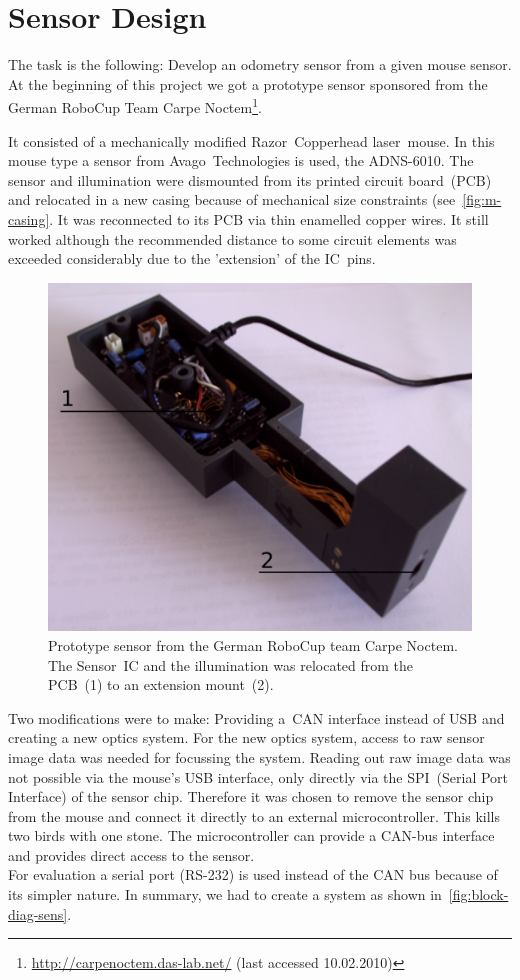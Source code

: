 \documentclass[12pt,a4paper]{article}
\begin{document}

\clearpage
\section{Sensor Design}

The task is the following: Develop an odometry sensor from a given mouse sensor.
At the beginning of this project we got a prototype sensor sponsored from the German RoboCup Team Carpe Noctem\footnote{\url{http://carpenoctem.das-lab.net/} (last accessed 10.02.2010)}.

It consisted of a mechanically modified Razor~Copperhead laser~mouse.
In this mouse type a sensor from Avago~Technologies is used, the ADNS-6010.
The sensor and illumination were dismounted from its printed circuit board~(PCB) and relocated in a new casing because of mechanical size constraints (see~\autoref{fig:m-casing}.
It was reconnected to its PCB via thin enamelled copper wires.
It still worked although the recommended distance to some circuit elements was exceeded considerably due to the 'extension' of the IC~pins.

\begin{figure}[hb]
\begin{center}  
\includegraphics[width=0.6\columnwidth]{figures/proto.pdf}
\caption{\label{fig:m-casing}
Prototype sensor from the German RoboCup team Carpe Noctem.
The Sensor~IC and the illumination was relocated from the PCB~(1) to an extension mount~(2).
}   
\end{center}
\end{figure}

Two modifications were to make: Providing a~CAN interface instead of USB and creating a new optics system.
For the new optics system, access to raw sensor image data was needed for focussing the system.
Reading out raw image data was not possible via the mouse's USB interface, only directly via the SPI~(Serial Port Interface) of the sensor chip.
Therefore it was chosen to remove the sensor chip from the mouse and connect it directly to an external microcontroller.
This kills two birds with one stone.
The microcontroller can provide a CAN-bus interface and provides direct access to the sensor.\\
For evaluation a serial port (RS-232) is used instead of the CAN bus because of its simpler nature.
In summary, we had to create a system as shown in~\autoref{fig:block-diag-sens}.
\end{document}
